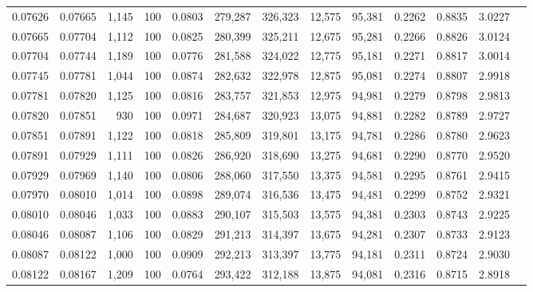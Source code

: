 \begin{tabular}{rrrrrrrrrrrrr}
0.07626 & 0.07665 & 1,145 & 100 &                                     0.0803 & 279,287 & 326,323 &  12,575 &  95,381 & 0.2262 & 0.8835 & 3.0227 \\
0.07665 & 0.07704 & 1,112 & 100 &                                     0.0825 & 280,399 & 325,211 &  12,675 &  95,281 & 0.2266 & 0.8826 & 3.0124 \\
0.07704 & 0.07744 & 1,189 & 100 &                                     0.0776 & 281,588 & 324,022 &  12,775 &  95,181 & 0.2271 & 0.8817 & 3.0014 \\
0.07745 & 0.07781 & 1,044 & 100 &                                     0.0874 & 282,632 & 322,978 &  12,875 &  95,081 & 0.2274 & 0.8807 & 2.9918 \\
0.07781 & 0.07820 & 1,125 & 100 &                                     0.0816 & 283,757 & 321,853 &  12,975 &  94,981 & 0.2279 & 0.8798 & 2.9813 \\
0.07820 & 0.07851 &   930 & 100 &                                     0.0971 & 284,687 & 320,923 &  13,075 &  94,881 & 0.2282 & 0.8789 & 2.9727 \\
0.07851 & 0.07891 & 1,122 & 100 &                                     0.0818 & 285,809 & 319,801 &  13,175 &  94,781 & 0.2286 & 0.8780 & 2.9623 \\
0.07891 & 0.07929 & 1,111 & 100 &                                     0.0826 & 286,920 & 318,690 &  13,275 &  94,681 & 0.2290 & 0.8770 & 2.9520 \\
0.07929 & 0.07969 & 1,140 & 100 &                                     0.0806 & 288,060 & 317,550 &  13,375 &  94,581 & 0.2295 & 0.8761 & 2.9415 \\
0.07970 & 0.08010 & 1,014 & 100 &                                     0.0898 & 289,074 & 316,536 &  13,475 &  94,481 & 0.2299 & 0.8752 & 2.9321 \\
0.08010 & 0.08046 & 1,033 & 100 &                                     0.0883 & 290,107 & 315,503 &  13,575 &  94,381 & 0.2303 & 0.8743 & 2.9225 \\
0.08046 & 0.08087 & 1,106 & 100 &                                     0.0829 & 291,213 & 314,397 &  13,675 &  94,281 & 0.2307 & 0.8733 & 2.9123 \\
0.08087 & 0.08122 & 1,000 & 100 &                                     0.0909 & 292,213 & 313,397 &  13,775 &  94,181 & 0.2311 & 0.8724 & 2.9030 \\
0.08122 & 0.08167 & 1,209 & 100 &                                     0.0764 & 293,422 & 312,188 &  13,875 &  94,081 & 0.2316 & 0.8715 & 2.8918 \\

\end{tabular}
